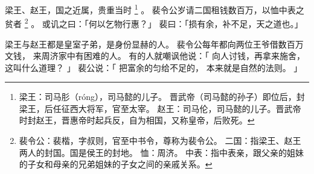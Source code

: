
\switchcolumn*[\section{}]

梁王、赵王，国之近属，贵重当时%
\footnote{%
    梁王：司马肜（róng），司马懿的儿子。
          晋武帝（司马懿的孙子）即位后，封梁王，后任征西大将军，官至太宰。
    赵王：司马伦，司马懿的儿子。晋武帝时封赵王，晋惠帝时起兵反，自为相国，又称皇帝，后败死。
}%
。
裴令公岁请二国租钱数百万，以恤中表之贫者%
\footnote{%
    裴令公：裴楷，字叔则，官至中书令，尊称为裴令公。
    二国：指梁王、赵王两人的封国。国是侯王的封地。
    恤：周济。
    中表：指中表亲，跟父亲的姐妹的子女和母亲的兄弟姐妹的子女之间的亲戚关系。
}%
。
或讥之曰：「何以乞物行惠？」
裴曰：「损有余，补不足，天之道也。」

\switchcolumn

梁王与赵王都是皇室子弟，是身份显赫的人。
裴令公每年都向两位王爷借数百万文钱，
来周济家中有困难的人。
有的人就嘲讽他说：「
    向人讨钱，再拿来施舍，
    这叫什么道理？
」
裴公说：「
    把富余的匀给不足的，
    本来就是自然的法则。
」

